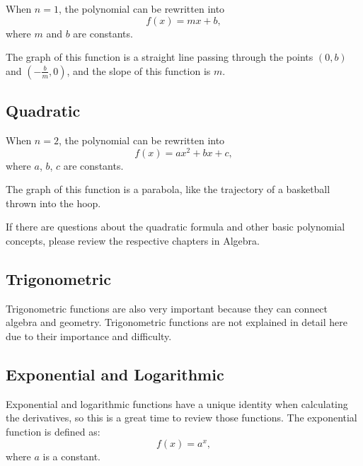 When $n = 1$, the polynomial can be rewritten into
\[
f(x) = mx + b,
\]
where $m$ and $b$ are constants.

The graph of this function is a straight line passing through the points $(0, b)$ and $\left(-\frac{b}{m}, 0\right)$, and the slope of this function is $m$.

\subsection{Quadratic}
\label{sss:quad-d2ac}

When $n = 2$, the polynomial can be rewritten into
\[
f(x) = ax^2 + bx + c,
\]
where $a$, $b$, $c$ are constants.

The graph of this function is a parabola, like the trajectory of a basketball thrown into
the hoop.


If there are questions about the quadratic formula and other basic polynomial concepts,
please review the respective chapters in Algebra.

\subsection{Trigonometric}
\label{sss:trig-4a83}

Trigonometric functions are also very important because they can connect algebra and
geometry. Trigonometric functions are not explained in detail here due to their importance
and difficulty.

\subsection{Exponential and Logarithmic}
\label{sss:expo-d74f}

Exponential and logarithmic functions have a unique identity when calculating the
derivatives, so this is a great time to review those functions. The exponential function
is defined as:
\[
f(x) = a^x,
\]
where $a$ is a constant.

